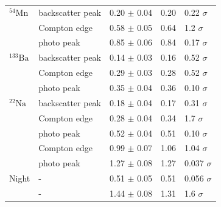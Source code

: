 \begin{center}
\begin{adjustbox}{max width=\linewidth, keepaspectratio}
\begin{tabular}{lllll}
            $^{54}\text{Mn}$  & backscatter peak & 0.20 $\pm$ 0.04                              & 0.20                                          & 0.22  $\sigma$ \\
            ~                 & Compton edge     & 0.58 $\pm$ 0.05                              & 0.64                                          & 1.2   $\sigma$ \\
            ~                 & photo peak       & 0.85 $\pm$ 0.06                              & 0.84                                          & 0.17  $\sigma$ \\
            $^{133}\text{Ba}$ & backscatter peak & 0.14 $\pm$ 0.03                              & 0.16                                          & 0.52  $\sigma$ \\
            ~                 & Compton edge     & 0.29 $\pm$ 0.03                              & 0.28                                          & 0.52  $\sigma$ \\
            ~                 & photo peak       & 0.35 $\pm$ 0.04                              & 0.36                                          & 0.10  $\sigma$ \\
            $^{22}\text{Na}$  & backscatter peak & 0.18 $\pm$ 0.04                              & 0.17                                          & 0.31  $\sigma$ \\
            ~                 & Compton edge     & 0.28 $\pm$ 0.04                              & 0.34                                          & 1.7   $\sigma$ \\
            ~                 & photo peak       & 0.52 $\pm$ 0.04                              & 0.51                                          & 0.10  $\sigma$ \\
            ~                 & Compton edge     & 0.99 $\pm$ 0.07                              & 1.06                                          & 1.04  $\sigma$ \\
            ~                 & photo peak       & 1.27 $\pm$ 0.08                              & 1.27                                          & 0.037 $\sigma$ \\
            Night             & -                & 0.51 $\pm$ 0.05                              & 0.51                                          & 0.056 $\sigma$ \\
            ~                 & -                & 1.44 $\pm$ 0.08                              & 1.31                                          & 1.6   $\sigma$ \\
            \bottomrule
            \end{tabular}
        \end{adjustbox}
        \label{tab:EnergyComparison}
    \end{center}
\endminipage
%
